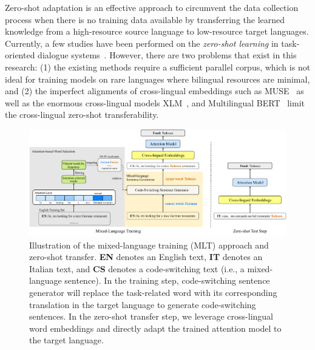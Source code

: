 \documentclass[letterpaper]{article} %
\begin{document}
Zero-shot adaptation is an effective approach to circumvent the data collection process when there is no training data available by transferring the learned knowledge from a high-resource source language to low-resource target languages. Currently, a few studies have been performed on the \textit{zero-shot learning} in task-oriented dialogue systems~\cite{chen2018xl,schuster2019cross}.
However, there are two problems that exist in this research: 
(1) the existing methods require a sufficient parallel corpus, which is not ideal for training models on rare languages where bilingual resources are minimal, and (2) the imperfect alignments of cross-lingual embeddings such as MUSE~\cite{conneau2017word} as well as the enormous cross-lingual models XLM~\cite{lample2019cross}, and Multilingual BERT~\cite{devlin2019bert} limit the cross-lingual zero-shot transferability.


\begin{figure}[ht!]
    \centering
    \includegraphics[scale=0.82]{mixed_language_training.pdf}
    \caption{Illustration of the mixed-language training (MLT) approach and zero-shot transfer. \textbf{EN} denotes an English text, \textbf{IT} denotes an Italian text, and \textbf{CS} denotes a code-switching text (i.e., a mixed-language sentence). In the training step, code-switching sentence generator will replace the task-related word with its corresponding translation in the target language to generate code-switching sentences. In the zero-shot transfer step, we leverage cross-lingual word embeddings and directly adapt the trained attention model to the target language.}
    \label{fig:MLT}
\end{figure}
\end{document}
